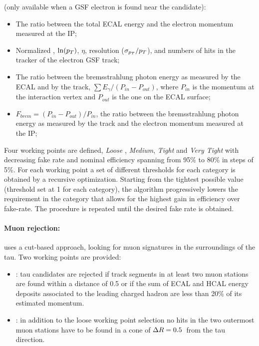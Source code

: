  (only available when a GSF electron is found near the candidate):
\begin{itemize}
\item The ratio between the total ECAL energy and the electron momentum measured at the IP;
\item Normalized \chisq, $\ln (p_{T})$, $\eta$, \pT resolution ($\sigma_{p_{T}}/p_{T}$), and numbers of hits in the tracker of the electron GSF track;
\item The ratio between the bremsstrahlung photon energy as measured by the ECAL and by the track, $\sum E_{\gamma}/(P_{in}-P_{out})$, where $P_{in}$ is the momentum at the interaction vertex and $P_{out}$ is the one on the ECAL surface;
\item $F_{brem}=(P_{in}-P_{out})/P_{in}$, the ratio between the bremsstrahlung photon energy as measured by the track and the electron momentum measured at the IP;
\end{itemize}

Four working points are defined, \emph{Loose }, \emph{Medium}, \emph{Tight} and \emph{Very Tight} with decreasing fake rate and nominal efficiency spanning from 95\% to 80\% in steps of 5\%. For each working point a set of different thresholds for each category is obtained by a recursive optimization. Starting from the tightest possible value (threshold set at 1 for each category), the algorithm progressively lowers the requirement in the category that allows for the highest gain in efficiency over fake-rate. The procedure is repeated until the desired fake rate is obtained.

\paragraph{Muon rejection:} uses a cut-based approach, looking for muon signatures in the surroundings of the tau. Two working points are provided:

\begin{itemize}
\item {}: tau candidates are rejected if track segments in at least two muon stations are found within a \DR distance of 0.5 or if the sum of ECAL and HCAL energy deposits associated to the leading charged hadron are less than 20\% of its estimated momentum.
\item {}: in addition to the loose working point selection no hits in the two outermost muon stations have to be found in a cone of $\Delta R = 0.5$\ from the tau direction.
\end{itemize}

